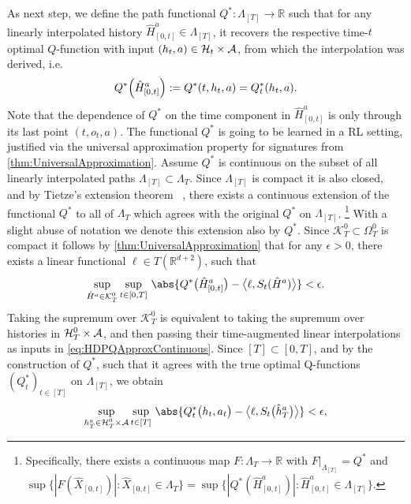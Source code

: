 \documentclass[
    a4paper,
    11pt,
    bibliography=totoc,
    listof=totoc,      
    headinclude=true,
    cleardoublepage=empty,
]{scrbook}
\theoremstyle{plain}
\theoremstyle{definition}
\theoremstyle{remark}
\newcommand{\SetR}{\mathbb R}
\newcommand{\SpaceA}{{\cal A}}
\newcommand{\SpaceH}{{\cal H}}
\begin{document}
As next step, we define the path functional $Q^*:\Lambda_{[T]} \to \SetR$ such that for any 
linearly interpolated history $\hat{H}^{a}_{[0,t]}\in\Lambda_{[T]}$, it 
recovers the respective time-$t$ optimal $Q$-function with input $(h_t,a) 
\in \SpaceH_t\times\SpaceA$, from which the interpolation was derived, i.e.
\begin{equation}
\label{eq:HDPOptimalQWithTime}
    Q^*\Bigl( \hat{H}^{a}_{[0,t]} \Bigr)
    := Q^*(t,h_t, a) = Q^*_t(h_t,a).
\end{equation}
Note that the dependence of $Q^*$ on the time component in $\hat{H}^a_{[0,t]}$
is only through its last point $(t,o_t,a)$. The functional $Q^*$ is going to be learned in a RL setting, justified via the universal approximation 
property for signatures from \cref{thm:UniversalApproximation}. 
Assume $Q^*$ is continuous on the subset of all linearly interpolated paths 
$\Lambda_{[T]}\subset \Lambda_T$. Since $\Lambda_{[T]}$ is compact it is also 
closed, and by Tietze's extension theorem 
~\cite[Satz~12.10.3]{kaltenbaeck2014_fa}, there exists a continuous extension 
of the functional $Q^*$ to all of $\Lambda_T$ which agrees with the original $Q^*$ on $\Lambda_{[T]}$.%
\footnote{
    Specifically, there exists a continuous map $F:\Lambda_T\to\SetR$ with 
    ${F|}_{\Lambda_{[T]}} = Q^*$ and 
    $\sup\{|F(\hat X_{[0,t]})| : \hat X_{[0,t]}\in\Lambda_T \} 
    = \sup\{|Q^*(\hat H^a_{[0,t]})|: \hat H^a_{[0,t]} \in \Lambda_{[T]}\}$. 
    }
With a slight abuse of notation we denote this extension also by $Q^*$. Since 
$\mathcal{K}^0_T\subset\Omega^0_T$ is compact it follows by 
\cref{thm:UniversalApproximation} that for any $\epsilon>0$, there exists a 
linear functional $\ell\in T(\SetR^{d+2})$, such that
\begin{equation}
\label{eq:HDPQApproxContinuous}
    \sup_{\hat H^a\in\mathcal{K}^0_T} \sup_{t\in[0,T]} \,
    \abs{
        Q^*\bigl(\hat H^a_{[0,t]}\bigr) 
        - \bigl\langle \ell, S_t(\hat H^a) \bigr\rangle
    } < \epsilon.
\end{equation}
Taking the supremum over $\mathcal{K}^0_T$ is equivalent to taking the 
supremum over histories in $\SpaceH^0_T\times\SpaceA$, and then passing their 
time-augmented linear interpolations as inputs in \eqref{eq:HDPQApproxContinuous}. Since 
$[T]\subset[0,T]$, and by the construction of $Q^*$, such that it agrees with 
the true optimal Q-functions $(Q^*_t)_{t\in[T]}$ on $\Lambda_{[T]}$, we 
obtain
\begin{equation}
\label{eq:HDPQApproxDiscrete}
    \sup_{h^{a}_T\in\SpaceH^0_T\times\SpaceA} \sup_{t\in[T]} \,
    \abs{ 
        Q_t^*\bigl(h_{t}, a_t\bigr)
        - \bigl\langle \ell, S_t\bigl(\hat h^{a}_T\bigr) \bigr\rangle
    } < \epsilon,
\end{equation}
\end{document}
